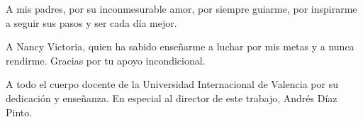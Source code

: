 
\cleardoublepage

\vspace{15ex}

A mis padres, por su inconmesurable amor, por siempre guiarme, por inspirarme a seguir sus pasos y ser cada día mejor.
\medskip
\medskip

A Nancy Victoria, quien ha sabido enseñarme a luchar por mis metas y a nunca rendirme. Gracias por tu apoyo incondicional.
\medskip
\medskip

A todo el cuerpo docente de la Universidad Internacional de Valencia por su dedicación y enseñanza. En especial al director de este trabajo, Andrés Díaz Pinto.
\medskip